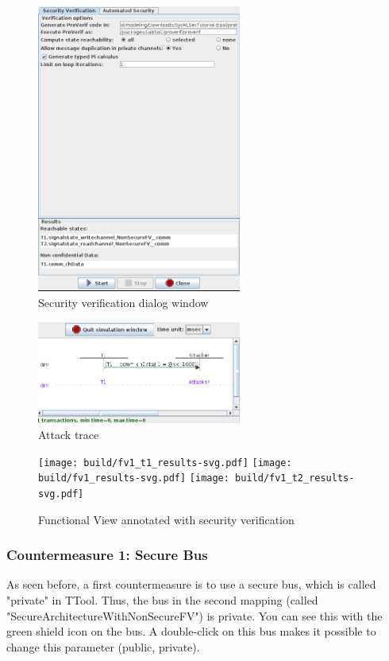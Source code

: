 \documentclass[12pt]{article}
\begin{document}
\begin{figure}[htbp]
\centering
\includegraphics[width=0.6\textwidth]{fig/proverif1.png}
\caption{Security verification dialog window} \label{fig:proverif1}
\end{figure}


\begin{figure}[htbp]
\centering
\includegraphics[width=0.6\textwidth]{fig/trace1.png}
\caption{Attack trace} \label{fig:trace1}
\end{figure}

\begin{figure}[htbp]
\centering
\texttt{[image: build/fv1\_t1\_results-svg.pdf]}
\texttt{[image: build/fv1\_results-svg.pdf]}
\texttt{[image: build/fv1\_t2\_results-svg.pdf]}
\caption{Functional View annotated with security verification} \label{fig:fv1results}
\end{figure}

\subsubsection{Countermeasure 1: Secure Bus}
As seen before, a first countermeasure is to use a secure bus, which is called "private" in TTool. Thus, the bus in the second mapping (called "SecureArchitectureWithNonSecureFV") is private. You can see this with the green shield icon on the bus. A double-click on this bus makes it possible to change this parameter (public, private).
\end{document}
